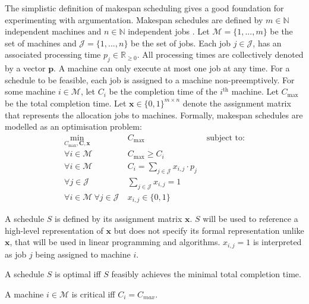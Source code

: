 The simplistic definition of makespan scheduling gives a good foundation for experimenting with argumentation. Makespan schedules are defined by $m\in\mathbb{N}$ independent machines and $n\in\mathbb{N}$ independent jobs \cite{sa}. Let $\mathcal{M}=\{1,...,m\}$ be the set of machines and $\mathcal{J}=\{1,...,n\}$ be the set of jobs. Each job $j\in\mathcal{J}$, has an associated processing time $p_j\in\mathbb{R}_{\geq 0}$. All processing times are collectively denoted by a vector $\mathbf{p}$. A machine can only execute at most one job at any time. For a schedule to be feasible, each job is assigned to a machine non-preemptively. For some machine $i\in\mathcal{M}$, let $C_i$ be the completion time of the $i^\text{th}$ machine. Let $C_{\max}$ be the total completion time. Let $\mathbf{x}\in\{0,1\}^{m\times n}$ denote the assignment matrix that represents the allocation jobs to machines. Formally, makespan schedules are modelled as an optimisation problem:
\begin{align*}
	\min_{C_{\max},\mathbf{C},\mathbf{x}}\ &C_{\max}&\text{ subject to:}\\
	\forall i\in\mathcal{M}\ &C_{\max}\geq C_i\\
	\forall i\in\mathcal{M}\ &C_i=\sum_{j\in\mathcal{J}}x_{i,j}\cdot p_j\\
	\forall j\in\mathcal{J}\ &\sum_{j\in\mathcal{J}}x_{i,j}=1\\
	\forall i\in\mathcal{M}\ \forall j\in\mathcal{J}\ &x_{i,j}\in\{0,1\}
\end{align*}

\begin{definition}
	\label{assignmentmatrix}
	
	A schedule $S$ is defined by its assignment matrix $\mathbf{x}$. $S$ will be used to reference a high-level representation of $\mathbf{x}$ but does not specify its formal representation unlike $\mathbf{x}$, that will be used in linear programming and algorithms. $x_{i,j}=1$ is interpreted as job $j$ being assigned to machine $i$.
\end{definition}

\begin{definition}
	A schedule $S$ is optimal iff $S$ feasibly achieves the minimal total completion time.
\end{definition}

\begin{definition}
	A machine $i\in\mathcal{M}$ is critical iff $C_i=C_{max}$.
\end{definition}

